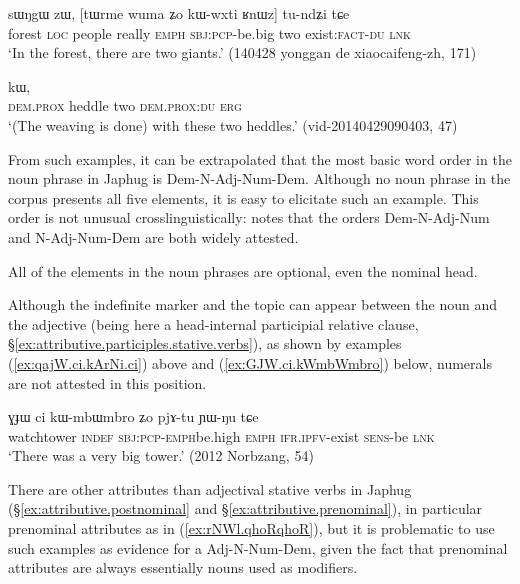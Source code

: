 \begin{exe}
\ex \label{ex:N.Adj.Num}
 \gll sɯŋgɯ zɯ, [tɯrme wuma ʑo kɯ-wxti ʁnɯz] tu-ndʑi tɕe\\
 forest \textsc{loc} people really \textsc{emph} \textsc{sbj}:\textsc{pcp}-be.big two exist:\textsc{fact}-\textsc{du} \textsc{lnk}\\
 \glt `In the forest, there are two giants.' (140428 yonggan de xiaocaifeng-zh, 171)
\end{exe}

\begin{exe}
\ex \label{ex:Dem.N.Num.Dem}
  kɯ, \\
 \textsc{dem}.\textsc{prox} heddle two \textsc{dem}.\textsc{prox}:\textsc{du} \textsc{erg} \\
 \glt `(The weaving is done) with these two heddles.' (vid-20140429090403, 47)
\end{exe}

From such examples, it can be extrapolated that the most basic word order in the noun phrase in Japhug is Dem-N-Adj-Num-Dem. Although no noun phrase in the corpus presents all five elements, it is easy to elicitate such an example. This order is not unusual crosslinguistically: \citet{cinque05universal20} notes that the orders  Dem-N-Adj-Num and N-Adj-Num-Dem are both widely attested.

All of the elements in the noun phrases are optional, even the nominal head.

Although the indefinite marker  and the topic  can appear between the noun and the adjective (being here a head-internal participial relative clause, §\ref{ex:attributive.participles.stative.verbs}), as shown by examples (\ref{ex:qajW.ci.kArNi.ci}) above and (\ref{ex:GJW.ci.kWmbWmbro}) below, numerals are not attested in this position.

\begin{exe}
\ex \label{ex:GJW.ci.kWmbWmbro}
 \gll ɣɟɯ ci kɯ-mbɯ\redp{}mbro ʑo pjɤ-tu ɲɯ-ŋu tɕe   \\
 watchtower \textsc{indef} \textsc{sbj}:\textsc{pcp}-\textsc{emph}\redp{}be.high \textsc{emph} \textsc{ifr}.\textsc{ipfv}-exist \textsc{sens}-be \textsc{lnk} \\
\glt  `There was a very big tower.' (2012 Norbzang, 54)
\end{exe}

There are other attributes than adjectival stative verbs in Japhug (§\ref{ex:attributive.postnominal} and §\ref{ex:attributive.prenominal}), in particular prenominal attributes as  in (\ref{ex:rNWl.qhoRqhoR}), but it is problematic to use such examples as evidence for a Adj-N-Num-Dem, given the fact that prenominal attributes are always essentially nouns used as modifiers.

